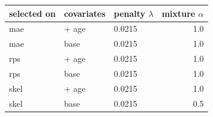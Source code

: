 
\begin{tabular}{lllr}
\toprule
selected on & covariates & penalty $\lambda$ & mixture $\alpha$\\
\midrule
mae & + age & 0.0215 & 1.0\\
mae & base & 0.0215 & 1.0\\
rps & + age & 0.0215 & 1.0\\
rps & base & 0.0215 & 1.0\\
skel & + age & 0.0215 & 1.0\\
skel & base & 0.0215 & 0.5\\
\bottomrule
\end{tabular}
